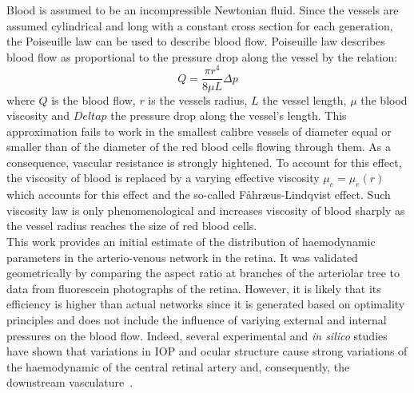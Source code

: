\documentclass[12pt,a4paper]{article}
\begin{document}
Blood is assumed to be an incompressible Newtonian fluid.
Since the vessels are assumed cylindrical and long with a constant cross section for each generation, the Poiseuille law can be used to describe blood flow.
Poiseuille law describes blood flow as proportional to the pressure drop along the vessel by the relation:
\begin{equation}
  \label{eq:PoiseuilleLaw}
  Q = \frac{\pi r^4}{8\mu L}\Delta p
\end{equation}
where $Q$ is the blood flow, $r$ is the vessels radius, $L$ the vessel length, $\mu$ the blood viscosity and $Delta p$ the pressure drop along the vessel's length.
This approximation fails to work in the smallest calibre vessels of diameter equal or smaller than of the diameter of the red blood cells flowing through them.
As a consequence, vascular resistance is strongly hightened.
To account for this effect, the viscosity of blood is replaced by a varying effective viscosity $\mu_e = \mu_e(r)$ which accounts for this effect and the so-called F\r{a}hr\ae us-Lindqvist effect.
Such viscosity law is only phenomenological and increases viscosity of blood sharply as the vessel radius reaches the size of red blood cells.\\
This work provides an initial estimate of the distribution of haemodynamic parameters in the arterio-venous network in the retina.
It was validated geometrically by comparing the aspect ratio at branches of the arteriolar tree to data from fluorescein photographs of the retina. 
However, it is likely that its efficiency is higher than actual networks since it is generated based on optimality principles and does not include the influence of variying external and internal pressures on the blood flow.
Indeed, several experimental and \textit{in silico} studies have shown that variations in IOP and ocular structure cause strong variations of the haemodynamic of the central retinal artery and, consequently, the downstream vasculature~\cite{Guidoboni_2014, Harris_1996}.
\end{document}

